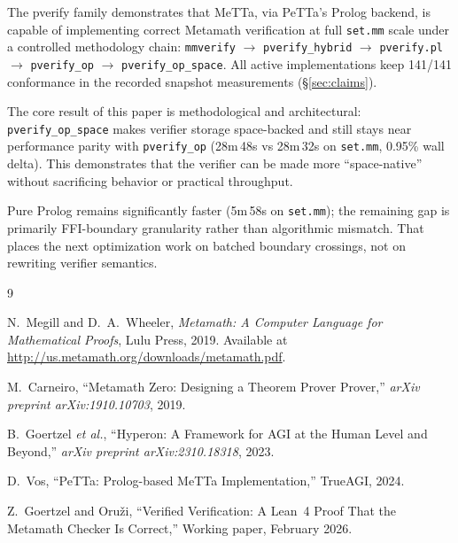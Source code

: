 \documentclass[11pt]{article}
\begin{document}
The pverify family demonstrates that MeTTa, via PeTTa's Prolog
backend, is capable of implementing correct Metamath verification at
full \texttt{set.mm} scale under a controlled methodology chain:
\texttt{mmverify} $\rightarrow$ \texttt{pverify\_hybrid} $\rightarrow$
\texttt{pverify.pl} $\rightarrow$ \texttt{pverify\_op} $\rightarrow$
\texttt{pverify\_op\_space}.
All active implementations keep 141/141 conformance in the recorded
snapshot measurements (\S\ref{sec:claims}).

The core result of this paper is methodological and architectural:
\texttt{pverify\_op\_space} makes verifier storage space-backed and
still stays near performance parity with \texttt{pverify\_op}
(28m\,48s vs 28m\,32s on \texttt{set.mm}, 0.95\% wall delta).
This demonstrates that the verifier can be made more ``space-native''
without sacrificing behavior or practical throughput.

Pure Prolog remains significantly faster (5m\,58s on \texttt{set.mm});
the remaining gap is primarily FFI-boundary granularity rather than
algorithmic mismatch.
That places the next optimization work on batched boundary crossings,
not on rewriting verifier semantics.

\begin{thebibliography}{9}

N.~Megill and D.~A.~Wheeler,
\emph{Metamath: A Computer Language for Mathematical Proofs},
Lulu Press, 2019.
Available at \url{http://us.metamath.org/downloads/metamath.pdf}.

M.~Carneiro,
``Metamath Zero: Designing a Theorem Prover Prover,''
\emph{arXiv preprint arXiv:1910.10703}, 2019.

B.~Goertzel \emph{et al.},
``Hyperon: A Framework for AGI at the Human Level and Beyond,''
\emph{arXiv preprint arXiv:2310.18318}, 2023.

D.~Vos,
``PeTTa: Prolog-based MeTTa Implementation,''
TrueAGI, 2024.

Z.~Goertzel and Oru\v{z}i,
``Verified Verification: A Lean~4 Proof That the Metamath
Checker Is Correct,'' Working paper, February 2026.

\end{thebibliography}
\end{document}
